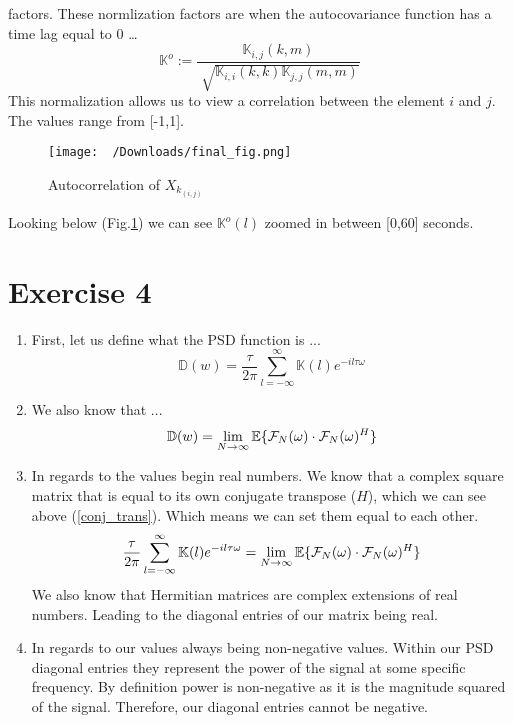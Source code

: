 \documentclass[letter,12pt]{article}
\begin{document}
\begin{enumerate}
	factors. These normlization factors are when the autocovariance function has a time lag equal to 0 \dots
	\begin{equation}
		\mathbb{K}^o := \frac{\mathbb{K}_{i,j}(k,m)}{\sqrt[]{\mathbb{K}_{i,i}(k,k)\mathbb{K}_{j,j}(m,m)}}
	\end{equation}
	This normalization allows us to view a correlation between the element $i$ and $j$. The values range from [-1,1].
	\begin{figure}[ht]
		\texttt{[image: ~/Downloads/final\_fig.png]}
		\caption[short]{Autocorrelation of $X_{k_{(i,j)}}$}
		\label{fig:detrend_correlation_graph}
	\end{figure}
	Looking below (Fig.\ref{fig:detrend_correlation_graph}) we can see $\mathbb{K}^o(l)$ zoomed in between [0,60] seconds.
\end{enumerate}

\newpage
\section{Exercise 4}

\begin{enumerate}[1.]
	\item First, let us define what the PSD function is ...
		\begin{equation}
			\mathbb{D}(w) = \frac{\tau}{2\pi}\sum_{l=-\infty}^{\infty}\mathbb{K}(l)e^{-il\tau\omega}
		\end{equation}
	\item We also know that ...
		\begin{equation}
			\mathbb{D}(w) = \lim_{N\to\infty}\mathbb{E}\{\CMcal{F}_N(\omega)\cdot\CMcal{F}_N(\omega)^{H}\}
			\label{conj_trans}
		\end{equation}
	\item In regards to the values begin real numbers. We know that a complex square matrix that is equal to its own
		conjugate transpose ($H$), which we can see above (\ref{conj_trans}). Which means we can set them equal to each other.
		\begin{equation}
			\frac{\tau}{2\pi}\sum_{l=-\infty}^{\infty}\mathbb{K}(l)e^{-il\tau\omega} = \lim_{N\to\infty}\mathbb{E}\{\CMcal{F}_N(\omega)\cdot\CMcal{F}_N(\omega)^{H}\}
		\end{equation}
		We also know that Hermitian matrices are complex extensions of real numbers. Leading to the diagonal entries of our matrix being real.
	\item In regards to our values always being non-negative values. Within our PSD diagonal entries they represent the power of the signal at some specific frequency.
		By definition power is non-negative as it is the magnitude squared of the signal. Therefore, our diagonal entries cannot be negative.


	
\end{enumerate}




\end{document}
